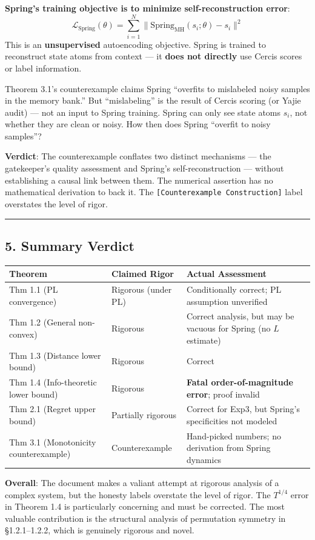 \documentclass[
  12pt,
]{article}
\begin{document}
\textbf{Spring's training objective is to minimize self-reconstruction error}:
\[\mathcal{L}_{\text{Spring}}(\theta) = \sum_{i=1}^{N} \|\text{Spring}_{\text{MH}}(s_i; \theta) - s_i\|^2\]
This is an \textbf{unsupervised} autoencoding objective. Spring is trained to reconstruct state atoms from context --- it \textbf{does not directly} use Cercis scores or label information.

Theorem 3.1's counterexample claims Spring ``overfits to mislabeled noisy samples in the memory bank.'' But ``mislabeling'' is the result of Cercis scoring (or Yajie audit) --- not an input to Spring training. Spring can only see state atoms $s_i$, not whether they are clean or noisy. How then does Spring ``overfit to noisy samples''?

\textbf{Verdict}: The counterexample conflates two distinct mechanisms --- the gatekeeper's quality assessment and Spring's self-reconstruction --- without establishing a causal link between them. The numerical assertion has no mathematical derivation to back it. The \texttt{[Counterexample Construction]} label overstates the level of rigor.

\begin{center}\rule{0.5\linewidth}{0.5pt}\end{center}

\subsection{5. Summary Verdict}\label{summary-verdict}

\begin{longtable}[]{@{}lll@{}}
\toprule\noalign{}
Theorem & Claimed Rigor & Actual Assessment \\
\midrule\noalign{}
\endhead
\bottomrule\noalign{}
\endlastfoot
Thm 1.1 (PL convergence) & Rigorous (under PL) & Conditionally correct; PL assumption unverified \\
Thm 1.2 (General non-convex) & Rigorous & Correct analysis, but may be vacuous for Spring (no $L$ estimate) \\
Thm 1.3 (Distance lower bound) & Rigorous & Correct \\
Thm 1.4 (Info-theoretic lower bound) & Rigorous & \textbf{Fatal order-of-magnitude error}; proof invalid \\
Thm 2.1 (Regret upper bound) & Partially rigorous & Correct for Exp3, but Spring's specificities not modeled \\
Thm 3.1 (Monotonicity counterexample) & Counterexample & Hand-picked numbers; no derivation from Spring dynamics \\
\end{longtable}

\textbf{Overall}: The document makes a valiant attempt at rigorous analysis of a complex system, but the honesty labels overstate the level of rigor. The $T^{1/4}$ error in Theorem 1.4 is particularly concerning and must be corrected. The most valuable contribution is the structural analysis of permutation symmetry in \S1.2.1--1.2.2, which is genuinely rigorous and novel.
\end{document}
